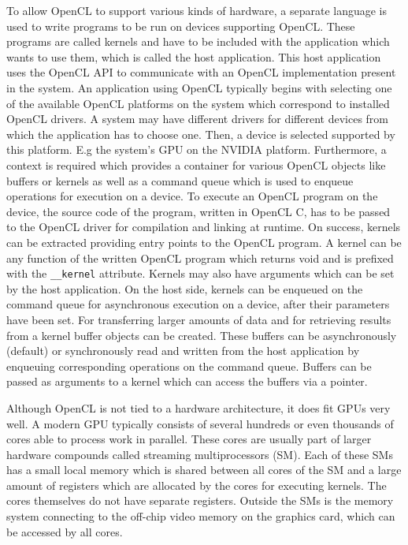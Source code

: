 To allow OpenCL to support various kinds of hardware, a separate language is used to write programs to be run on devices supporting OpenCL. These programs are called kernels and have to be included with the application which wants to use them, which is called the host application. This host application uses the OpenCL API to communicate with an OpenCL implementation present in the system. An application using OpenCL typically begins with selecting one of the available OpenCL platforms on the system which correspond to installed OpenCL drivers. A system may have different drivers for different devices from which the application has to choose one. Then, a device is selected supported by this platform. E.g the system's GPU on the NVIDIA platform. Furthermore, a context is required which provides a container for various OpenCL objects like buffers or kernels as well as a command queue which is used to enqueue operations for execution on a device.
To execute an OpenCL program on the device, the source code of the program, written in OpenCL C, has to be passed to the OpenCL driver for compilation and linking at runtime. On success, kernels can be extracted providing entry points to the OpenCL program. A kernel can be any function of the written OpenCL program which returns void and is prefixed with the \lstinline!__kernel! attribute. Kernels may also have arguments which can be set by the host application. On the host side, kernels can be enqueued on the command queue for asynchronous execution on a device, after their parameters have been set. For transferring larger amounts of data and for retrieving results from a kernel buffer objects can be created. These buffers can be asynchronously (default) or synchronously read and written from the host application by enqueuing corresponding operations on the command queue. Buffers can be passed as arguments to a kernel which can access the buffers via a pointer.

Although OpenCL is not tied to a hardware architecture, it does fit GPUs very well. A modern GPU typically consists of several hundreds or even thousands of cores able to process work in parallel. These cores are usually part of larger hardware compounds called streaming multiprocessors (SM). Each of these SMs has a small local memory which is shared between all cores of the SM and a large amount of registers which are allocated by the cores for executing kernels. The cores themselves do not have separate registers. Outside the SMs is the memory system connecting to the off-chip video memory on the graphics card, which can be accessed by all cores. 


